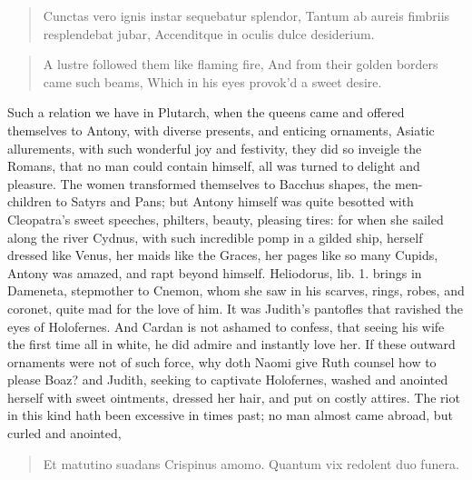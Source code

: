 \begin{latin}
\begin{verse}%
Cunctas vero ignis instar sequebatur splendor,
Tantum ab aureis fimbriis resplendebat jubar,
Accenditque in oculis dulce desiderium.
\end{verse}%
\end{latin}
\translationrule%
\begin{verse}%
A lustre followed them like flaming fire,
And from their golden borders came such beams,
Which in his eyes provok'd a sweet desire.
\end{verse}%

Such a relation we have in Plutarch, when the queens came and
offered themselves to Antony, with diverse presents, and enticing
ornaments, Asiatic allurements, with such wonderful joy and festivity,
they did so inveigle the Romans, that no man could contain himself, all
was turned to delight and pleasure. The women transformed themselves to
Bacchus shapes, the men-children to Satyrs and Pans; but Antony himself
was quite besotted with Cleopatra's sweet speeches, philters, beauty,
pleasing tires: for when she sailed along the river Cydnus, with such
incredible pomp in a gilded ship, herself dressed like Venus, her maids
like the Graces, her pages like so many Cupids, Antony was amazed, and
rapt beyond himself. Heliodorus, lib. 1. brings in Dameneta, stepmother
to Cnemon, whom she saw in his scarves, rings, robes, and
coronet, quite mad for the love of him. It was Judith's pantofles that
ravished the eyes of Holofernes. And Cardan is not ashamed to
confess, that seeing his wife the first time all in white, he did
admire and instantly love her. If these outward ornaments were not of
such force, why doth Naomi give Ruth counsel how to please Boaz?
and Judith, seeking to captivate Holofernes, washed and anointed
herself with sweet ointments, dressed her hair, and put on costly
attires. The riot in this kind hath been excessive in times past; no
man almost came abroad, but curled and anointed,

\begin{latin}
\begin{verse}%
Et matutino suadans Crispinus amomo.
Quantum vix redolent duo funera.
\end{verse}%
\end{latin}

